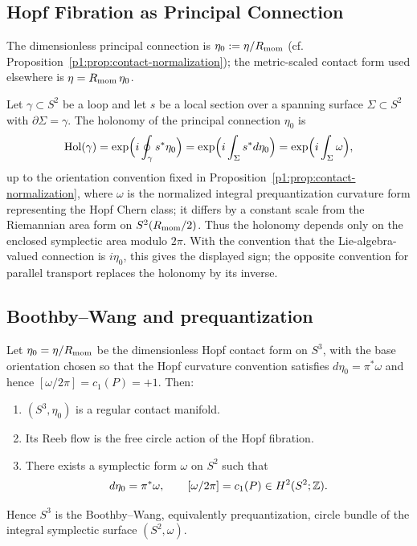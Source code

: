 \documentclass[11pt]{article}
\begin{document}
\subsection{Hopf Fibration as Principal Connection}
\label{p1:der:hopf-connection}
The dimensionless principal connection is $\eta_0:=\eta/R_{\mathrm{mom}}$ (cf. Proposition~\ref{p1:prop:contact-normalization}); the metric-scaled contact form used elsewhere is $\eta=R_{\mathrm{mom}}\,\eta_0$.
\begin{remark}
Let \(\gamma\subset S^2\) be a loop and let \(s\) be a local section over a
spanning surface \(\Sigma\subset S^2\) with \(\partial\Sigma=\gamma\).  The
holonomy of the principal connection \(\eta_0\) is
\[
\mathrm{Hol}(\gamma)
=\exp\Bigl(i\oint_{\gamma}s^*\eta_0\Bigr)
=\exp\Bigl(i\int_{\Sigma}s^*d\eta_0\Bigr)
=\exp\Bigl(i\int_{\Sigma}\omega\Bigr),
\]
up to the orientation convention fixed in Proposition~\ref{p1:prop:contact-normalization}, where
\(\omega\) is the normalized integral prequantization curvature form representing the Hopf
Chern class; it differs by a constant scale from the Riemannian area form on \(S^2(R_{\mathrm{mom}}/2)\).  Thus the holonomy depends only on the enclosed symplectic area
modulo \(2\pi\). With the convention that the Lie-algebra-valued connection is \(i\eta_0\), this gives the displayed sign; the opposite convention for parallel transport replaces the holonomy by its inverse.
\end{remark}

\subsection{Boothby--Wang and prequantization}
\label{p1:der:boothby-wang}

\begin{theorem}
\label{p1:thm:boothby-wang-hopf}
Let \(\eta_0=\eta/R_{\mathrm{mom}}\) be the dimensionless Hopf contact form on \(S^3\), with
the base orientation chosen so that the Hopf curvature convention satisfies
\(d\eta_0=\pi^*\omega\) and hence \([\omega/2\pi]=c_1(P)=+1\). Then:
\begin{enumerate}
    \item \((S^3,\eta_0)\) is a regular contact manifold.
    \item Its Reeb flow is the free circle action of the Hopf fibration.
    \item There exists a symplectic form \(\omega\) on \(S^2\) such that
    \[
    d\eta_0=\pi^*\omega,
    \qquad
    [\omega/2\pi]=c_1(P)\in H^2(S^2;\mathbb{Z}).
    \]
\end{enumerate}
Hence \(S^3\) is the Boothby--Wang, equivalently prequantization, circle bundle of
the integral symplectic surface \((S^2,\omega)\).
\end{theorem}
\end{document}
